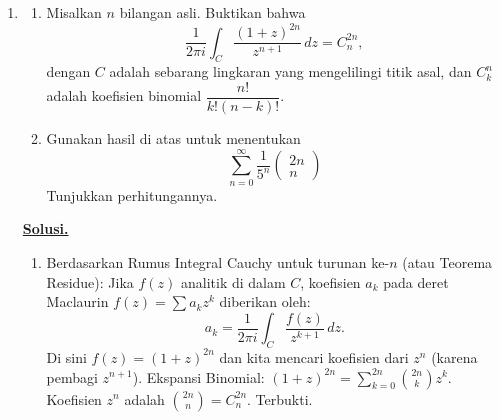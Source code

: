\documentclass[12pt,twoside]{article}
\newenvironment{solution}
{
	\par\noindent\textbf{\underline{Solusi.}}\\
}
{
	\par
}
\begin{document}
\begin{enumerate}
  \item \begin{enumerate}
          \item [(a)] Misalkan $n$ bilangan asli. Buktikan bahwa
                $$\dfrac{1}{2\pi i}\int_{C}\dfrac{(1+z)^{2n}}{z^{n+1}}\,dz=C_{n}^{2n},$$
                dengan $C$ adalah sebarang lingkaran yang mengelilingi titik asal, dan $C_k^n$ adalah koefisien binomial $\dfrac{n!}{k!(n-k)!}$.
          \item[(b)] Gunakan hasil di atas untuk menentukan
                $$\sum_{n=0}^{\infty}\dfrac{1}{5^n}\begin{pmatrix}
                    2n \\n
                  \end{pmatrix}$$
                Tunjukkan perhitungannya.
        \end{enumerate}
        \begin{solution}
          \begin{enumerate}
            \item[(a)] Berdasarkan Rumus Integral Cauchy untuk turunan ke-$n$ (atau Teorema Residue):
                  Jika $f(z)$ analitik di dalam $C$, koefisien $a_k$ pada deret Maclaurin $f(z) = \sum a_k z^k$ diberikan oleh:
                  $$ a_k = \frac{1}{2\pi i} \int_C \frac{f(z)}{z^{k+1}} \, dz. $$
                  Di sini $f(z) = (1+z)^{2n}$ dan kita mencari koefisien dari $z^n$ (karena pembagi $z^{n+1}$).
                  Ekspansi Binomial: $(1+z)^{2n} = \sum_{k=0}^{2n} \binom{2n}{k} z^k$.
                  Koefisien $z^n$ adalah $\binom{2n}{n} = C_n^{2n}$. Terbukti.


\end{enumerate}
\end{solution}
\end{enumerate}
\end{document}
